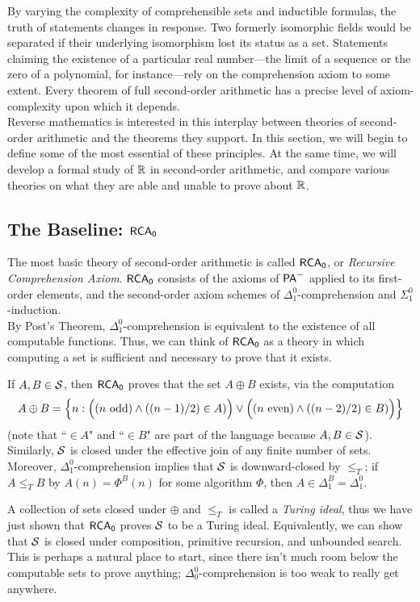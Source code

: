 \documentclass{amsart}
\begin{document}
	By varying the complexity of comprehensible sets and inductible formulas, the truth of statements changes in response. Two formerly isomorphic fields would be separated if their underlying isomorphism lost its status as a set. Statements claiming the existence of a particular real number---the limit of a sequence or the zero of a polynomial, for instance---rely on the comprehension axiom to some extent. Every theorem of full second-order arithmetic has a precise level of axiom-complexity upon which it depends.\\
	
	Reverse mathematics is interested in this interplay between theories of second-order arithmetic and the theorems they support. In this section, we will begin to define some of the most essential of these principles. At the same time, we will develop a formal study of $\R$ in second-order arithmetic, and compare various theories on what they are able and unable to prove about $\R$.
	
	\subsection{The Baseline: \texorpdfstring{$\RCA$}{RCA}} The most basic theory of second-order arithmetic is called $\RCA$, or \textit{Recursive Comprehension Axiom}. $\RCA$ consists of the axioms of $\sf{PA}^-$ applied to its first-order elements, and the second-order axiom schemes of $\Delta_1^0$-comprehension and $\Sigma_1^0$-induction.\\
	
	By Post's Theorem, $\Delta_1^0$-comprehension is equivalent to the existence of all computable functions. Thus, we can think of $\RCA$ as a theory in which computing a set is sufficient and necessary to prove that it exists.
	
	If $A,B\in \SS$, then $\RCA$ proves that the set $A\oplus B$ exists, via the computation
	$$
	A\oplus B = \Bigl\{n : \Big((n \text{ odd})\^((n-1)/2) \in A)\Big)\vee \Big((n \text{ even})\^((n-2)/2) \in B)\Big)\Bigr\}
	$$
	(note that ``$\in A$" and ``$\in B$" are part of the language because $A,B\in \SS$). Similarly, $\SS$ is closed under the effective join of any finite number of sets. Moreover, $\Delta_1^0$-comprehension implies that $\SS$ is downward-closed by $\leq_T$; if $A\leq_T B$ by $A(n)=\Phi^B(n)$ for some algorithm $\Phi$, then $A\in \Delta_1^B = \Delta_1^0$.
	
	A collection of sets closed under $\oplus$ and $\leq_T$ is called a \textit{Turing ideal}, thus we have just shown that $\RCA$ proves $\SS$ to be a Turing ideal. Equivalently, we can show that $\SS$ is closed under composition, primitive recursion, and unbounded search. This is perhaps a natural place to start, since there isn't much room below the computable sets to prove anything; $\Delta_0^0$-comprehension is too weak to really get anywhere.\\
	
\end{document}
